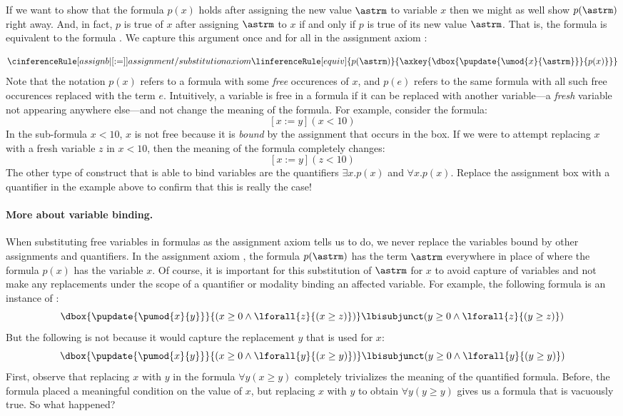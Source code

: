 \documentclass[11pt,twoside]{scrartcl}
\begin{document}
If we want to show that the formula $p(x)$ holds after assigning the new value $\astrm$ to variable $x$ then we might as well show $p(\astrm)$ right away.
And, in fact, $p$ is true of $x$ after assigning $\astrm$ to $x$ if and only if $p$ is true of its new value $\astrm$.
That is, the formula  is equivalent to the formula .
We capture this argument once and for all in the assignment axiom :

\[
\cinferenceRule[assignb|$\dibox{:=}$]{assignment / substitution axiom}
{\linferenceRule[equiv]
  {p(\astrm)}
  {\axkey{\dbox{\pupdate{\umod{x}{\astrm}}}{p(x)}}}
}
{}%
\]
Note that the notation $p(x)$ refers to a formula with some \emph{free} occurences of $x$, and $p(e)$ refers to the same formula with all such free occurences replaced with the term $e$.
Intuitively, a variable is free in a formula if it can be replaced with another variable---a \emph{fresh} variable not appearing anywhere else---and not change the meaning of the formula.
For example, consider the formula:
\[
[x := y](x < 10)
\]
In the sub-formula $x < 10$, $x$ is not free because it is \emph{bound} by the assignment that occurs in the box.
If we were to attempt replacing $x$ with a fresh variable $z$ in $x < 10$, then the meaning of the formula completely changes:
\[
[x := y](z < 10)
\]
The other type of construct that is able to bind variables are the quantifiers $\exists x. p(x)$ and $\forall x. p(x)$.
Replace the assignment box with a quantifier in the example above to confirm that this is really the case!

\paragraph{More about variable binding.}
When substituting free variables in formulas as the assignment axiom tells us to do, we never replace the variables bound by other assignments and quantifiers.
In the assignment axiom , the formula $p(\astrm)$ has the term $\astrm$ everywhere in place of where the formula $p(x)$ has the variable $x$.
Of course, it is important for this substitution of $\astrm$ for $x$ to avoid capture of variables and not make any replacements under the scope of a quantifier or modality binding an affected variable.
For example, the following formula is an instance of :
\[
\dbox{\pupdate{\pumod{x}{y}}}{(x\geq0 \land \lforall{z}{(x\geq z)})} \lbisubjunct (y\geq0 \land \lforall{z}{(y\geq z)})
\]
But the following is not because it would capture the replacement $y$ that is used for $x$:
\[
\dbox{\pupdate{\pumod{x}{y}}}{(x\geq0 \land \lforall{y}{(x\geq y)})} \lbisubjunct (y\geq0 \land \lforall{y}{(y\geq y)})
\]
First, observe that replacing $x$ with $y$ in the formula $\forall y (x \ge y)$ completely trivializes the meaning of the quantified formula.
Before, the formula placed a meaningful condition on the value of $x$, but replacing $x$ with $y$ to obtain $\forall y (y \ge y)$ gives us a formula that is vacuously true.
So what happened?
\end{document}
